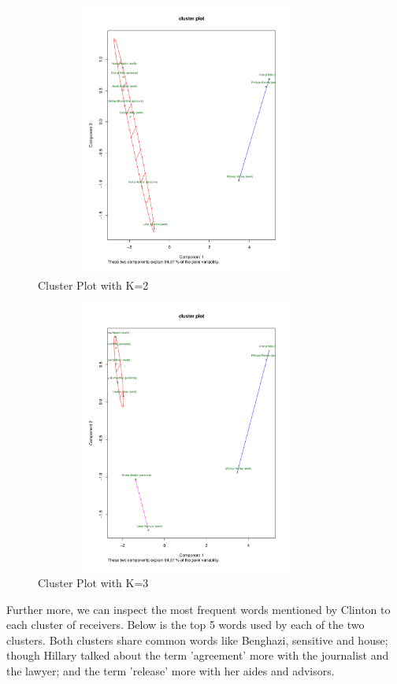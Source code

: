 \begin{figure}[h!]
    \centering
    \includegraphics[width=10cm,height=9cm]
    {daitong_and_yihe/c2}
    \caption{Cluster Plot with K=2}
    \label{fig:c2}
\end{figure}

\begin{figure}[h!]
    \centering
    \includegraphics[width=10cm,height=9cm]
    {daitong_and_yihe/c3}
    \caption{Cluster Plot with K=3}
    \label{fig:c2}
\end{figure}

\newpage
Further more, we can inspect the most frequent words mentioned by Clinton to each cluster of receivers. Below is the top 5 words used by each of the two clusters. Both clusters share common words like Benghazi, sensitive and house; though Hillary talked about the term 'agreement' more with the journalist and the lawyer; and the term 'release' more with her aides and advisors. 
\\

